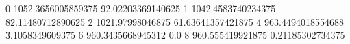 0 1052.3656005859375 92.02203369140625
1 1042.4583740234375 82.11480712890625
2 1021.97998046875 61.63641357421875
4 963.4494018554688 3.1058349609375
6 960.3435668945312 0.0
8 960.555419921875 0.21185302734375
